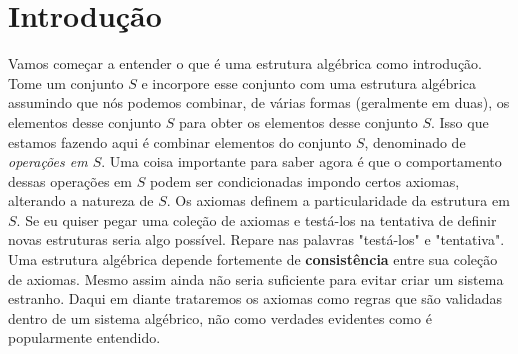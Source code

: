 \section{Introdução}
Vamos começar a entender o que é uma estrutura algébrica como introdução. Tome um conjunto $S$ e incorpore esse conjunto com uma estrutura algébrica assumindo que nós podemos combinar, de várias formas (geralmente em duas), os elementos desse conjunto $S$ para obter os elementos desse conjunto $S$. Isso que estamos fazendo aqui é combinar elementos do conjunto $S$, denominado de \textit{operações em $S$}. Uma coisa importante para saber agora é que o comportamento dessas operações em $S$ podem ser condicionadas impondo certos axiomas, alterando a natureza de $S$. Os axiomas definem a particularidade da estrutura em $S$. Se eu quiser pegar uma coleção de axiomas e testá-los na tentativa de definir novas estruturas seria algo possível. Repare nas palavras "testá-los" e "tentativa". Uma estrutura algébrica depende fortemente de \textbf{consistência} entre sua coleção de axiomas. Mesmo assim ainda não seria suficiente para evitar criar um sistema estranho. Daqui em diante trataremos os axiomas como regras que são validadas dentro de um sistema algébrico, não como verdades evidentes como é popularmente entendido.
